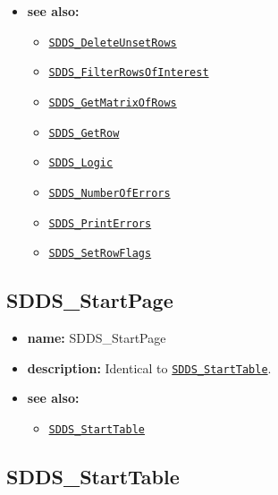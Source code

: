 \documentclass[11pt]{article}
\newcommand{\progref}[1]{\hyperref[SDDS_#1]{\tt SDDS\_#1}}
\begin{document}
\begin{itemize}
\item {\bf see also:}
\begin{itemize}
\item \progref{DeleteUnsetRows}
\item \progref{FilterRowsOfInterest}
\item \progref{GetMatrixOfRows}
\item \progref{GetRow}
\item \progref{Logic}
\item \progref{NumberOfErrors}
\item \progref{PrintErrors}
\item \progref{SetRowFlags}
\end{itemize}
\end{itemize}

\subsection{SDDS\_StartPage}
\label{SDDS_StartPage}

\begin{itemize}
\item {\bf name:}\newline
SDDS\_StartPage
\item {\bf description:}\newline
Identical to \progref{StartTable}.
\item {\bf see also:}
\begin{itemize}
\item \progref{StartTable}
\end{itemize}
\end{itemize}

\subsection{SDDS\_StartTable}
\label{SDDS_StartTable}
\end{document}
